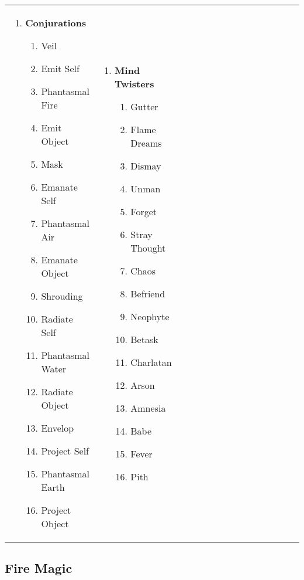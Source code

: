 \begin{tabular}{@{} p{0.25\linewidth} p{0.25\linewidth} p{0.25\linewidth} p{0.25\linewidth}}
\begin{enumerate}
	\item \textbf{Conjurations}
	\begin{enumerate}
		\item Veil
		\item Emit Self
		\item Phantasmal Fire
		\item Emit Object
		\item Mask
		\item Emanate Self
		\item Phantasmal Air
		\item Emanate Object
		\item Shrouding
		\item Radiate Self
		\item Phantasmal Water
		\item Radiate Object
		\item Envelop
		\item Project Self
		\item Phantasmal Earth
		\item Project Object
	\end{enumerate}
\end{enumerate} &
\begin{enumerate}
	\item \textbf{Mind Twisters}
	\begin{enumerate}
		\item Gutter
		\item Flame Dreams
		\item Dismay
		\item Unman
		\item Forget
		\item Stray Thought
		\item Chaos
		\item Befriend
		\item Neophyte
		\item Betask
		\item Charlatan
		\item Arson
		\item Amnesia
		\item Babe
		\item Fever
		\item Pith
	\end{enumerate}
\end{enumerate} \\
\end{tabular}
\pagebreak
\subsection{Fire Magic}

